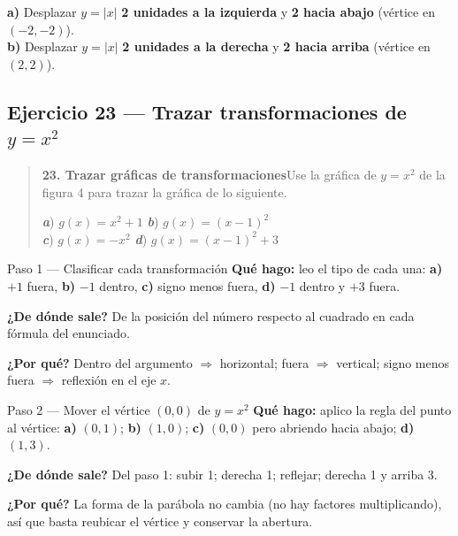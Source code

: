 \documentclass[11pt]{article}
\begin{document}
\begin{resp}
\textbf{a)} Desplazar $y=|x|$ \textbf{2 unidades a la izquierda} y \textbf{2 hacia abajo} (vértice en $(-2,-2)$).\\
\textbf{b)} Desplazar $y=|x|$ \textbf{2 unidades a la derecha} y \textbf{2 hacia arriba} (vértice en $(2,2)$).
\end{resp}

\subsection*{Ejercicio 23 — Trazar transformaciones de $y=x^2$}

\begin{quote}
\textbf{23. Trazar gráficas de transformaciones}\quad Use la gráfica de $y=x^2$ de la figura 4 para trazar la gráfica de lo siguiente.

\textbf{\textit{a}}) $g(x)=x^2+1$ \hfill \textbf{\textit{b}}) $g(x)=(x-1)^2$\\
\textbf{\textit{c}}) $g(x)=-x^2$ \hfill \textbf{\textit{d}}) $g(x)=(x-1)^2+3$
\end{quote}

\begin{paso}{Paso 1 --- Clasificar cada transformación}
\textbf{Qué hago:} leo el tipo de cada una: \textbf{a)} $+1$ fuera, \textbf{b)} $-1$ dentro, \textbf{c)} signo menos fuera, \textbf{d)} $-1$ dentro y $+3$ fuera.

\textbf{¿De dónde sale?} De la posición del número respecto al cuadrado en cada fórmula del enunciado.

\textbf{¿Por qué?} Dentro del argumento $\Rightarrow$ horizontal; fuera $\Rightarrow$ vertical; signo menos fuera $\Rightarrow$ reflexión en el eje $x$.
\end{paso}

\begin{paso}{Paso 2 --- Mover el vértice $(0,0)$ de $y=x^2$}
\textbf{Qué hago:} aplico la regla del punto al vértice: \textbf{a)} $(0,1)$; \textbf{b)} $(1,0)$; \textbf{c)} $(0,0)$ pero abriendo hacia abajo; \textbf{d)} $(1,3)$.

\textbf{¿De dónde sale?} Del paso 1: subir 1; derecha 1; reflejar; derecha 1 y arriba 3.

\textbf{¿Por qué?} La forma de la parábola no cambia (no hay factores multiplicando), así que basta reubicar el vértice y conservar la abertura.
\end{paso}
\end{document}

